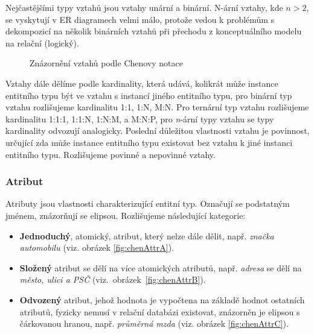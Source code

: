 \documentclass[czech,bachelor,public,dept460,male,oneside]{diploma}
\begin{document}
		Nejčastějšími typy vztahů jsou vztahy unární a binární. N-ární vztahy, kde $n > 2$, se vyskytují v ER diagramech velmi málo, protože vedou k problémům s dekompozicí na několik binárních vztahů při přechodu z konceptuálního modelu na relační (logický).
		
		\begin{figure}[!h]
			\centering
			\caption[Znázornění vztahů podle Chenovy notace]{Znázornění vztahů podle Chenovy notace}
		\end{figure}
	
		Vztahy dále dělíme podle kardinality, která udává, kolikrát může instance entitního typu být ve vztahu s instancí jiného entitního typu, pro binární typ vztahu  rozlišujeme kardinalitu 1:1, 1:N, M:N. Pro ternární typ vztahu rozlišujeme kardinalitu 1:1:1, 1:1:N, 1:N:M, a M:N:P, pro \textit{n}-ární typy vztahu se typy kardinality odvozují analogicky. Poslední důležitou vlastnosti vztahu je povinnost, určující zda může instance entitního typu existovat bez vztahu k jiné instanci entitního typu. Rozlišujeme povinné a nepovinné vztahy.
		
		\subsubsection{Atribut}
		Atributy jsou vlastnosti charakterizující entitní typ. Označují se podstatným jménem, znázorňují se elipsou. Rozlišujeme následující kategorie:
		
		\begin{itemize}
			\item \textbf{Jednoduchý}, atomický, atribut, který nelze dále dělit, např. \textit{značka automobilu} (viz. obrázek \ref{fig:chenAttrA}).
			\item \textbf{Složený} atribut se dělí na více atomických atributů, např. \textit{adresa} se dělí na \textit{město, ulici a PSČ} (viz.~obrázek~\ref{fig:chenAttrB}).
			\item \textbf{Odvozený} atribut, jehož hodnota je vypočtena na základě hodnot ostatních atributů, fyzicky nemusí v relační databázi existovat, znázorněn je elipsou s čárkovanou hranou, např. \textit{průměrná mzda} (viz. obrázek \ref{fig:chenAttrC}).
		\end{itemize}
	
\end{document}
